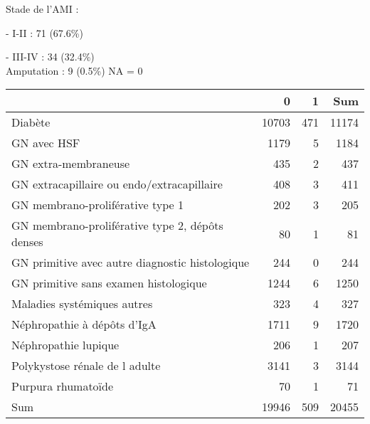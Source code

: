 \documentclass[11pt,a4paper]{article}\usepackage[]{graphicx}\usepackage[]{color}
\begin{document}
Stade de l’AMI : 

- I-II : 71 (67.6\%)

- III-IV : 34 (32.4\%)
~\\

Amputation : 9 (0.5\%) NA = 0

\begin{table}[H]
\centering
\begin{tabular}{lrrr}
  \hline
 & 0 & 1 & Sum \\ 
  \hline
Diabète & 10703 & 471 & 11174 \\ 
  GN avec HSF & 1179 & 5 & 1184 \\ 
  GN extra-membraneuse & 435 & 2 & 437 \\ 
  GN extracapillaire ou endo/extracapillaire & 408 & 3 & 411 \\ 
  GN membrano-proliférative type 1 & 202 & 3 & 205 \\ 
  GN membrano-proliférative type 2, dépôts denses & 80 & 1 & 81 \\ 
  GN primitive avec autre diagnostic histologique & 244 & 0 & 244 \\ 
  GN primitive sans examen histologique & 1244 & 6 & 1250 \\ 
  Maladies systémiques autres & 323 & 4 & 327 \\ 
  Néphropathie à dépôts d'IgA & 1711 & 9 & 1720 \\ 
  Néphropathie lupique & 206 & 1 & 207 \\ 
  Polykystose rénale de l adulte & 3141 & 3 & 3144 \\ 
  Purpura rhumatoïde & 70 & 1 & 71 \\ 
  Sum & 19946 & 509 & 20455 \\ 
   \hline
\end{tabular}
\end{table}
\end{document}
